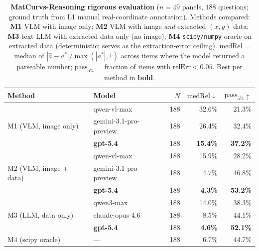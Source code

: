 
\begin{table}[t]
\centering
\caption{\textbf{MatCurvs-Reasoning rigorous evaluation} ($n{=}49$ panels,
$188$ questions; ground truth from L1 manual real-coordinate annotation).
Methods compared: \textbf{M1} VLM with image only;
\textbf{M2} VLM with image \emph{and} extracted $(x,y)$ data;
\textbf{M3} text LLM with extracted data only (no image);
\textbf{M4} \texttt{scipy/numpy} oracle on extracted data (deterministic;
serves as the extraction-error ceiling).
$\mathrm{medRel}$ = median of $|{\hat{a}-a^{*}}|/\max(|a^{*}|,1)$ across
items where the model returned a parseable number; $\mathrm{pass}_{5\%}$ =
fraction of items with $\mathrm{relErr}<0.05$. Best per method in
\textbf{bold}.}
\label{tab:mr-rigorous-headline}
\small
\begin{tabular}{llrrr}
\toprule
Method & Model & $N$ & $\mathrm{medRel}\downarrow$ & $\mathrm{pass}_{5\%}\uparrow$ \\
\midrule
\multirow{3}{*}{M1 (VLM, image only)}
  & qwen-vl-max            & 188 & 32.6\% & 21.3\% \\
  & gemini-3.1-pro-preview & 188 & 26.4\% & 32.4\% \\
  & \textbf{gpt-5.4}       & 188 & \textbf{15.4\%} & \textbf{37.2\%} \\
\midrule
\multirow{3}{*}{M2 (VLM, image + data)}
  & qwen-vl-max            & 188 & 15.9\% & 28.2\% \\
  & gemini-3.1-pro-preview & 188 &  4.7\% & 46.8\% \\
  & \textbf{gpt-5.4}       & 188 & \textbf{4.3\%}  & \textbf{53.2\%} \\
\midrule
\multirow{3}{*}{M3 (LLM, data only)}
  & qwen3-max              & 188 & 14.0\% & 38.3\% \\
  & claude-opus-4.6        & 188 &  8.5\% & 44.1\% \\
  & \textbf{gpt-5.4}       & 188 & \textbf{4.6\%}  & \textbf{52.1\%} \\
\midrule
M4 (scipy oracle) & --- & 188 & 6.7\% & 44.7\% \\
\bottomrule
\end{tabular}
\end{table}


